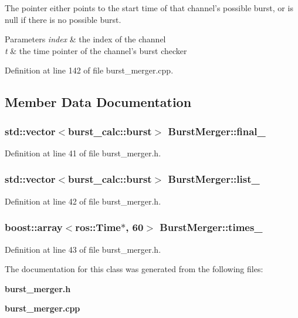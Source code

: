 \-The pointer either points to the start time of that channel's possible burst, or is null if there is no possible burst.


\begin{DoxyParams}{\-Parameters}
{\em index} & the index of the channel \\
\hline
{\em t} & the time pointer of the channel's burst checker \\
\hline
\end{DoxyParams}


\-Definition at line 142 of file burst\-\_\-merger.\-cpp.



\subsection{\-Member \-Data \-Documentation}
\subsubsection[{final\-\_\-}]{\setlength{\rightskip}{0pt plus 5cm}std\-::vector$<${\bf burst\-\_\-calc\-::burst}$>$ {\bf \-Burst\-Merger\-::final\-\_\-}\hspace{0.3cm}{\ttfamily  [private]}}\label{classBurstMerger_a61ab2ca2e27a7fd5f10fed3d14fb06ff}


\-Definition at line 41 of file burst\-\_\-merger.\-h.

\subsubsection[{list\-\_\-}]{\setlength{\rightskip}{0pt plus 5cm}std\-::vector$<${\bf burst\-\_\-calc\-::burst}$>$ {\bf \-Burst\-Merger\-::list\-\_\-}\hspace{0.3cm}{\ttfamily  [private]}}\label{classBurstMerger_aae0b4d171e1b02d773d0c59827485f68}


\-Definition at line 42 of file burst\-\_\-merger.\-h.

\subsubsection[{times\-\_\-}]{\setlength{\rightskip}{0pt plus 5cm}boost\-::array$<$ros\-::\-Time$\ast$, 60$>$ {\bf \-Burst\-Merger\-::times\-\_\-}\hspace{0.3cm}{\ttfamily  [private]}}\label{classBurstMerger_a39124ae6931916418e4f5863e67d3405}


\-Definition at line 43 of file burst\-\_\-merger.\-h.



\-The documentation for this class was generated from the following files\-:\begin{DoxyCompactItemize}
\item 
{\bf burst\-\_\-merger.\-h}\item 
{\bf burst\-\_\-merger.\-cpp}\end{DoxyCompactItemize}
